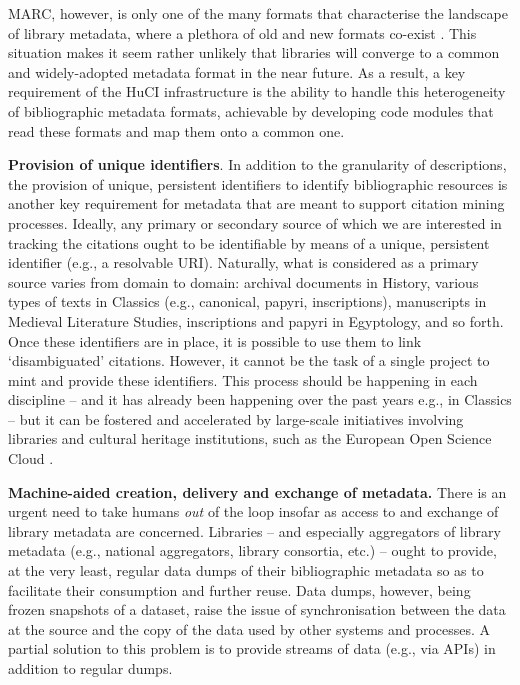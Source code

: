 MARC, however, is only one of the many formats that characterise the landscape of library metadata, where a plethora of old and new formats co-exist \cite{tennant_bibliographic_2004}. This situation makes it seem rather unlikely that libraries will converge to a common and widely-adopted metadata format in the near future. As a result, a key requirement of the HuCI infrastructure is the ability to handle this heterogeneity of bibliographic metadata formats, achievable by developing code modules that read these formats and map them onto a common one. 

\textbf{Provision of unique identifiers}. In addition to the granularity of descriptions, the provision of unique, persistent identifiers to identify bibliographic resources is another key requirement for metadata that are meant to support citation mining processes. Ideally, any primary or secondary source of which we are interested in tracking the citations ought to be identifiable by means of a unique, persistent identifier (e.g., a resolvable URI). Naturally, what is considered as a primary source varies from domain to domain: archival documents in History, various types of texts in Classics (e.g., canonical, papyri, inscriptions), manuscripts in Medieval Literature Studies, inscriptions and papyri in Egyptology, and so forth. Once these identifiers are in place, it is possible to use them to link `disambiguated' citations. However, it cannot be the task of a single project to mint and provide these identifiers. This process should be happening in each discipline -- and it has already been happening over the past years e.g., in Classics \cite{romanello_using_2017} -- but it can be fostered and accelerated by large-scale initiatives involving libraries and cultural heritage institutions, such as the European Open Science Cloud \cite{hellstrom_second_2020}.

\textbf{Machine-aided creation, delivery and exchange of metadata.} There is an urgent need to take humans \textit{out} of the loop insofar as access to and exchange of library metadata are concerned. Libraries -- and especially aggregators of library metadata (e.g., national aggregators, library consortia, etc.) -- ought to provide, at the very least, regular data dumps of their bibliographic metadata so as to facilitate their consumption and further reuse. Data dumps, however, being frozen snapshots of a dataset, raise the issue of synchronisation between the data at the source and the copy of the data used by other systems and processes. A partial solution to this problem is to provide streams of data (e.g., via APIs) in addition to regular dumps. 

